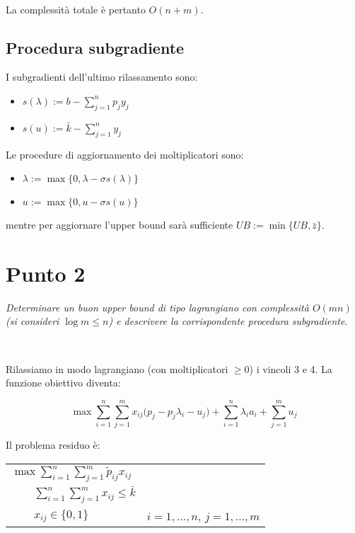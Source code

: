 \documentclass[11pt]{book}
\begin{document}
\

La complessit\`a totale \`e pertanto $O(n + m)$.

\subsection*{Procedura subgradiente}

I subgradienti dell'ultimo rilassamento sono:

\begin{itemize}
\item $s(\lambda) := b - \sum\limits_{j=1}^n p_j y_j$
\item $s(u) := \bar{k} - \sum\limits_{j=1}^n y_j$
\end{itemize}

Le procedure di aggiornamento dei moltiplicatori sono:

\begin{itemize}
\item $\lambda := \max\{0, \lambda - \sigma s(\lambda)\}$
\item $u := \max\{0, u-\sigma s(u)\}$
\end{itemize}

mentre per aggiornare l'upper bound sar\`a sufficiente $UB := \min \{
UB, \bar{z}\}$.

\section*{Punto 2}

\textit{Determinare un buon upper bound di tipo lagrangiano con
  complessit\`a $O(mn)$ (si consideri $\log m \leq n$) e descrivere la
corrispondente procedura subgradiente}.

\

Rilassiamo in modo lagrangiano (con moltiplicatori $\geq 0$) i vincoli
3 e 4. La funzione obiettivo diventa:

$$
\max \sum\limits_{i=1}^n\sum\limits_{j=1}^m x_{ij} \bigr ( p_j -
p_j\lambda_i - u_j \bigr ) + \sum\limits_{i=1}^n \lambda_i a_i +
\sum\limits_{j=1}^m u_j
$$

Il problema residuo \`e:

\begin{center}
\begin{tabular}{ll}
$\max \sum\limits_{i=1}^n\sum\limits_{j=1}^m \tilde{p}_{ij}x_{ij}$\\
$\qquad\sum\limits_{i=1}^n\sum\limits_{j=1}^m x_{ij} \leq \bar{k}$\\
$\qquad x_{ij} \in \{0,1\}$ & $i=1,\dots,n$, $j=1,\dots,m$ \\
\end{tabular}
\end{center}
\end{document}
